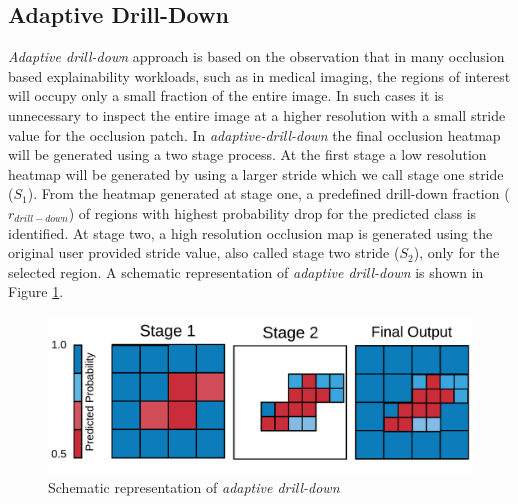 \subsection{Adaptive Drill-Down}\label{sec:ada-drill-down}
\textit{Adaptive drill-down} approach is based on the observation that in many occlusion based explainability workloads, such as in medical imaging, the regions of interest will occupy only a small fraction of the entire image.
In such cases it is unnecessary to inspect the entire image at a higher resolution with a small stride value for the occlusion patch.
In \textit{adaptive-drill-down} the final occlusion heatmap will be generated using a two stage process. At the first stage a low resolution heatmap will be generated by using a larger stride which we call stage one stride ($S_1$). From the heatmap generated at stage one, a predefined drill-down fraction ($r_{drill-down}$) of regions with highest probability drop for the predicted class is identified. At stage two, a high resolution occlusion map is generated using the original user provided stride value, also called stage two stride ($S_2$), only for the selected region. A schematic representation of \textit{adaptive drill-down} is shown in Figure \ref{fig:adaptive-drill-down}.

\begin{figure}[t]
\includegraphics[width=\columnwidth]{images/adaptive-drill-down}
\caption{Schematic representation of \textit{adaptive drill-down}}
\label{fig:adaptive-drill-down}
\end{figure}

